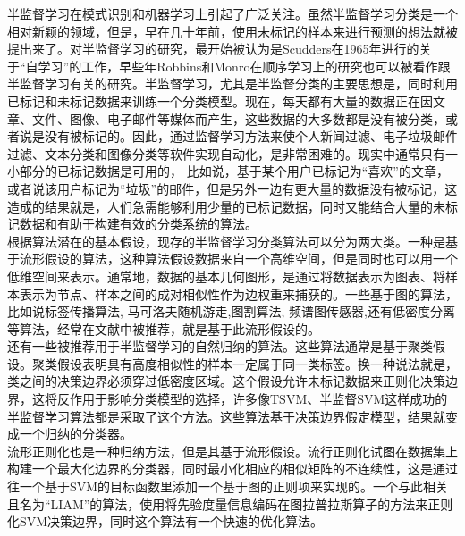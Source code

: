 \documentclass[10pt,journal,compsoc]{IEEEtran}
\begin{document}
% 
% 
% 
% 
半监督学习在模式识别和机器学习上引起了广泛关注。虽然半监督学习分类是一个相对新颖的领域，但是，早在几十年前，使用未标记的样本来进行预测的想法就被提出来了。对半监督学习的研究，最开始被认为是Scudders在1965年进行的关于“自学习”的工作，早些年Robbins和Monro在顺序学习上的研究也可以被看作跟半监督学习有关的研究。半监督学习，尤其是半监督分类的主要思想是，同时利用已标记和未标记数据来训练一个分类模型。现在，每天都有大量的数据正在因文章、文件、图像、电子邮件等媒体而产生，这些数据的大多数都是没有被分类，或者说是没有被标记的。因此，通过监督学习方法来使个人新闻过滤、电子垃圾邮件过滤、文本分类和图像分类等软件实现自动化，是非常困难的。现实中通常只有一小部分的已标记数据是可用的， 比如说，基于某个用户已标记为“喜欢”的文章，或者说该用户标记为“垃圾”的邮件，但是另外一边有更大量的数据没有被标记，这造成的结果就是，人们急需能够利用少量的已标记数据，同时又能结合大量的未标记数据和有助于构建有效的分类系统的算法。\\
根据算法潜在的基本假设，现存的半监督学习分类算法可以分为两大类。一种是基于流形假设的算法，这种算法假设数据来自一个高维空间，但是同时也可以用一个低维空间来表示。通常地，数据的基本几何图形，是通过将数据表示为图表、将样本表示为节点、样本之间的成对相似性作为边权重来捕获的。一些基于图的算法，比如说标签传播算法, 马可洛夫随机游走,图割算法, 频谱图传感器,还有低密度分离等算法，经常在文献中被推荐，就是基于此流形假设的。\\
还有一些被推荐用于半监督学习的自然归纳的算法。这些算法通常是基于聚类假设。聚类假设表明具有高度相似性的样本一定属于同一类标签。换一种说法就是，类之间的决策边界必须穿过低密度区域。这个假设允许未标记数据来正则化决策边界，这将反作用于影响分类模型的选择，许多像TSVM、半监督SVM这样成功的半监督学习算法都是采取了这个方法。这些算法基于决策边界假定模型，结果就变成一个归纳的分类器。\\
流形正则化也是一种归纳方法，但是其基于流形假设。流行正则化试图在数据集上构建一个最大化边界的分类器，同时最小化相应的相似矩阵的不连续性，这是通过往一个基于SVM的目标函数里添加一个基于图的正则项来实现的。一个与此相关且名为“LIAM”的算法，使用将先验度量信息编码在图拉普拉斯算子的方法来正则化SVM决策边界，同时这个算法有一个快速的优化算法。\\
\end{document}
